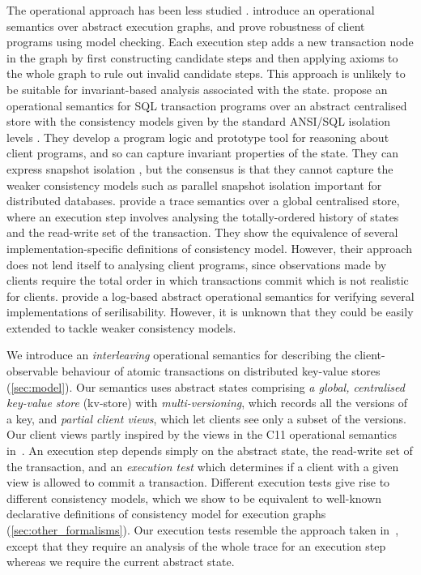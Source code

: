 The operational approach has been less studied \cite{sureshConcur,alonetogether,seebelieve,push-pull}.
\citet{sureshConcur} introduce an operational semantics over abstract
execution graphs, and prove robustness of client programs using model
checking. Each execution step adds a new transaction node in the graph
by first constructing candidate steps and then applying axioms to the
whole graph to rule out invalid candidate steps.  This approach is
unlikely to be suitable for invariant-based analysis associated with
the state.  \citet{alonetogether} propose an operational semantics for
SQL transaction programs over an abstract centralised store with the consistency
models given by the standard ANSI/SQL isolation levels \cite{si}. They
develop a program logic and prototype tool for reasoning about client
programs, and so can capture invariant properties of the state. They can
express snapshot isolation \cite{si}, but the consensus is
that they cannot
capture the weaker consistency models such as parallel snapshot isolation \cite{PSI} 
important for distributed databases. 
\citet{seebelieve} provide a trace semantics
over a global centralised store, where an execution step involves
analysing the totally-ordered
history of states and the read-write set of the transaction.
They show the equivalence of several
implementation-specific definitions of consistency model. However, their
approach does not lend itself to  analysing client programs,
since observations made by clients require the total order in
which transactions commit which is not realistic for clients. 
\citet{push-pull} provide a log-based abstract operational semantics for verifying 
several implementations of serilisability.
However, 
it is unknown that they could be easily extended to tackle weaker consistency models.



We introduce an \emph{interleaving} operational semantics for
describing the client-observable behaviour of atomic transactions on
distributed key-value stores (\cref{sec:model}). Our semantics uses abstract states
comprising \emph{a global, centralised key-value store} (kv-store) with
\emph{multi-versioning}, which records all the versions of a key, and
\emph{partial client views}, which let clients see only a subset of the
versions.  Our client views partly inspired by the views in the C11
operational semantics in~\cite{promises}.  An execution step depends
simply on the abstract state, the read-write set of the transaction, and an \emph{execution test} which
determines if a client with a given view is allowed to commit a
transaction. Different execution tests give rise to different consistency models, 
which we show to be equivalent to well-known
declarative definitions of consistency model for execution graphs (\cref{sec:other_formalisms}).
Our execution tests resemble the  approach taken in~\cite{seebelieve},
except that they require an analysis of the whole trace for an
execution step whereas we require the current abstract state. 




